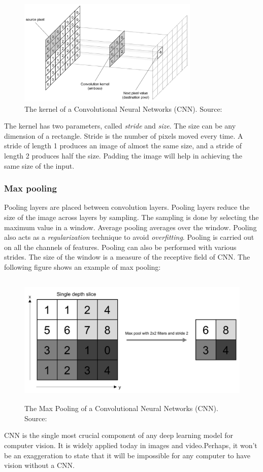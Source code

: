 \begin{figure}[H]
	\centering
	\includegraphics[height=2in]{images/kernel.png}
	\caption{The kernel of a Convolutional Neural Networks (CNN). Source:\cite{bib:dlforcv}}
	\label{fig:kernel}
\end{figure}
The kernel has two parameters, called \textit{stride} and \textit{size}. The size can be any dimension of a
rectangle. Stride is the number of pixels moved every time. A stride of length 1 produces an
image of almost the same size, and a stride of length 2 produces half the size. Padding the
image will help in achieving the same size of the input\cite{bib:dlforcv}.

\subsubsection{Max pooling}
Pooling layers are placed between convolution layers. Pooling layers reduce the size of the
image across layers by sampling. The sampling is done by selecting the maximum value in
a window. Average pooling averages over the window. Pooling also acts as a \textit{regularization}
technique to avoid \textit{overfitting}. Pooling is carried out on all the channels of features. Pooling
can also be performed with various strides\cite{bib:dlforcv}.
The size of the window is a measure of the receptive field of CNN. The following figure
shows an example of max pooling:
\begin{figure}[H]
	\centering
	\includegraphics[height=2.5in]{images/maxpooling.png}
	\caption{The Max Pooling of a Convolutional Neural Networks (CNN). Source:\cite{bib:dlforcv}}
	\label{fig:maxpool}
\end{figure}
CNN is the single most crucial component of any deep learning model for computer
vision. It is widely applied today in images and video.Perhaps, it won't be an exaggeration to state that it will be impossible for any computer to have vision without a CNN.

